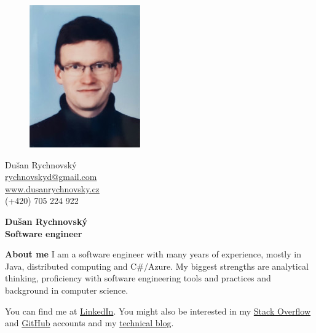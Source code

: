 \documentclass[a4paper,11pt,final]{memoir}
\newcommand{\Sep}{\vspace{1.4em}}
\newenvironment{AboutMe}
	{\ignorespaces\textbf{\color{RoyalBlue} About me}}
	{\Sep\ignorespacesafterend}
\begin{document}
\begin{figure}
	\hfill
	\includegraphics[width=0.7\columnwidth]{photo.jpg}
	\vspace{-7.5cm}
\end{figure}

\begin{flushright}\small
	Dušan Rychnovský \\
	\url{rychnovskyd@gmail.com}  \\
	\url{www.dusanrychnovsky.cz} \\
	(+420) 705 224 922
\end{flushright}\normalsize
\framebreak


\Huge\bfseries {\color{RoyalBlue} Dušan Rychnovský} \\
\Large\bfseries  Software engineer \\

\normalsize\normalfont

\begin{AboutMe}
I am a software engineer with many years of experience, mostly in Java, distributed computing and C\#/Azure. My biggest strengths are analytical thinking, proficiency with software engineering tools and practices and background in computer science.

\medskip
You can find me at 
\href{http://cz.linkedin.com/pub/du%C5%A1an-rychnovsk%C3%BD/96/a42/a0/}{LinkedIn}.
You might also be interested in my
\href{http://stackoverflow.com/users/1103412/dusan-rychnovsky}{Stack Overflow} and
\href{https://github.com/dusan-rychnovsky}{GitHub} accounts and my
\href{http://blog.dusanrychnovsky.cz}{technical blog}.
\end{AboutMe}
\end{document}

